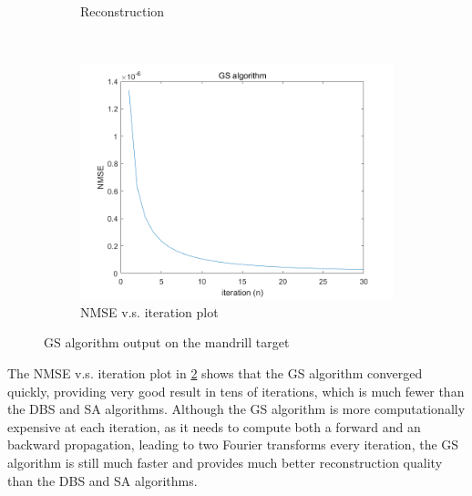 \begin{figure}[H]
\begin{subfigure}[t]{0.3\textwidth}
    \caption{Reconstruction}
    \label{fig:GS_recon_i_30}
  \end{subfigure}
  \\
  \begin{subfigure}[t]{0.7\textwidth}
    \centering
    \includegraphics[width=\textwidth]{GS_NMSE_plot.png}
    \caption{NMSE v.s. iteration plot}
    \label{fig:GS_NMSE_plot}
  \end{subfigure}
  \caption{GS algorithm output on the mandrill target}
  \label{fig:GS algorithm output on the mandrill target}
\end{figure}


The NMSE v.s. iteration plot in \cref{fig:GS_NMSE_plot} shows that the GS algorithm converged quickly, providing very good result in tens of iterations, which is much fewer than the DBS and SA algorithms. Although the GS algorithm is more computationally expensive at each iteration, as it needs to compute both a forward and an backward propagation, leading to two Fourier transforms every iteration, the GS algorithm is still much faster and provides much better reconstruction quality than the DBS and SA algorithms.

